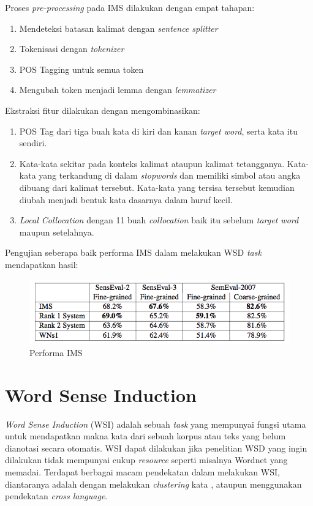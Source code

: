 Proses \textit{pre-processing} pada IMS dilakukan dengan empat tahapan:
\begin{enumerate}
	\item Mendeteksi batasan kalimat dengan \textit{sentence splitter}
	\item Tokenisasi dengan \textit{tokenizer}
	\item POS Tagging untuk semua token
	\item Mengubah token menjadi lemma dengan \textit{lemmatizer}
\end{enumerate}

Ekstraksi fitur dilakukan dengan mengombinasikan:

\begin{enumerate}
	\item POS Tag dari tiga buah kata di kiri dan kanan \textit{target word}, serta kata itu sendiri. 
	\item Kata-kata sekitar pada konteks kalimat ataupun kalimat tetangganya. Kata-kata yang terkandung di dalam \textit{stopwords} dan memiliki simbol atau angka dibuang dari kalimat tersebut. Kata-kata yang tersisa tersebut kemudian diubah menjadi bentuk kata dasarnya dalam huruf kecil.
	\item \textit{Local Collocation} dengan 11 buah \textit{collocation} baik itu sebelum \textit{target word} maupun setelahnya. 
\end{enumerate}

Pengujian seberapa baik performa IMS dalam melakukan  WSD \textit{task} mendapatkan hasil:

\begin{figure}
	\centering
	\includegraphics[width=1\linewidth]{adit_pics/Performa-IMS}
	\caption{Performa IMS \citep{zhong2010makes}}
	\label{fig:Performa-IMS}
\end{figure}

\section{Word Sense Induction}
\textit{Word Sense Induction} (WSI) adalah sebuah \textit{task} yang mempunyai fungsi utama untuk mendapatkan makna kata dari sebuah korpus atau teks yang belum dianotasi secara otomatis. WSI dapat dilakukan jika penelitian WSD yang ingin dilakukan tidak mempunyai cukup \textit{resource} seperti misalnya Wordnet yang memadai. Terdapat berbagai macam pendekatan dalam melakukan WSI, diantaranya adalah dengan melakukan \textit{clustering} kata \citep{denkowski2009survey}, ataupun menggunakan pendekatan \textit{cross language}.
	
